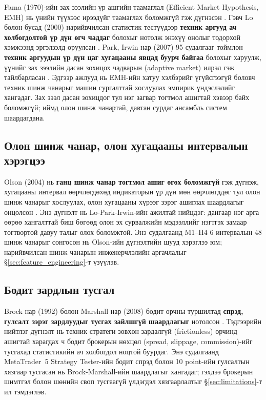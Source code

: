 Fama (1970)-ийн зах зээлийн үр ашгийн таамаглал (Efficient Market Hypothesis, EMH) нь үнийн түүхээс ирээдүйг таамаглах боломжгүй гэж дүгнэсэн \cite{fama1970efficient}. Гэвч Lo болон бусад (2000) нарийвчилсан статистик тестүүдээр \textbf{техник аргууд ач холбогдолтой үр дүн өгч чаддаг} болохыг нотолж энэхүү онолыг тодорхой хэмжээнд эргэлзэлд оруулсан \cite{lo2000foundations}. Park, Irwin нар (2007) 95 судалгааг тоймлон \textbf{техник аргуудын үр дүн цаг хугацааны явцад буурч байгаа} болохыг харуулж, үүнийг зах зээлийн дасан зохицох чадварын (adaptive market) илрэл гэж тайлбарласан \cite{park2007we}. Эдгээр ажлууд нь EMH-ийн хатуу хэлбэрийг үгүйсгээгүй боловч техник шинж чанарыг машин сургалттай хослуулах эмпирик үндэслэлийг хангадаг. Зах зээл дасан зохицдог тул нэг загвар тогтмол ашигтай хэвээр байх боломжгүй; иймд олон шинж чанартай, давтан сурдаг ансамбль систем шаардагдана.

\subsection{Олон шинж чанар, олон хугацааны интервалын хэрэгцээ}

Olson (2004) нь \textbf{ганц шинж чанар тогтмол ашиг өгөх боломжгүй} гэж дүгнэж, хугацааны интервал өөрчлөгдөхөд индикаторын үр дүн мөн өөрчлөгддөг тул олон шинж чанарыг хослуулах, олон хугацааны хүрээг зэрэг ашиглах шаардлагыг онцолсон \cite{olson2004have}. Энэ дүгнэлт нь Lo-Park-Irwin-ийн ажилтай нийцдэг: дангаар нэг арга өөрөө хангалттай биш бөгөөд олон эх сурвалжийн мэдээллийг нэгтгэх замаар тогтвортой давуу талыг олох боломжтой. Энэ судалгаанд M1--H4 6 интервалын 48 шинж чанарыг сонгосон нь Olson-ийн дүгнэлтийн шууд хэрэглээ юм; нарийвчилсан шинж чанарын инженерчлэлийн аргачлалыг §\ref{sec:feature_engineering}-т үзүүлэв.

\subsection{Бодит зардлын тусгал}

Brock нар (1992) болон Marshall нар (2008) бодит орчны туршилтад \textbf{спрэд, гулсалт зэрэг зардлуудыг тусгах зайлшгүй шаардлагыг} нотолсон \cite{brock1992simple,marshall2008technical}. Тэдгээрийн нийтлэг дүгнэлт нь техник стратеги зөвхөн зардалгүй (frictionless) орчинд ашигтай харагдах ч бодит брокерын нөхцөл (spread, slippage, commission)-ийг тусгахад статистикийн ач холбогдол ноцтой буурдаг. Энэ судалгаанд MetaTrader~5 Strategy Tester-ийн бодит спрэд болон 10 point-ийн гулсалтын хязгаар тусгасан нь Brock-Marshall-ийн шаардлагыг хангадаг; гэхдээ брокерын шимтгэл болон шөнийн своп тусгаагүй үлдэгдэл хязгаарлалтыг §\ref{sec:limitations}-т ил тэмдэглэв.

